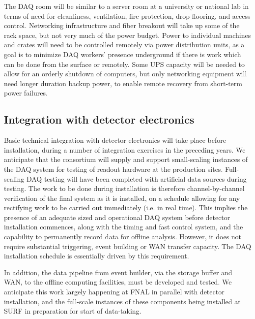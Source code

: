 The DAQ room will be similar to a server room at a university or national lab in terms of need for cleanliness, ventilation, fire protection, drop flooring, and access control. Networking infrastructure and fiber breakout will take up some of the rack space, but not very much of the power budget. Power to individual machines and crates will need to be controlled remotely via power distribution units, as a goal is to minimize DAQ workers' presence underground if there is work which can be done from the surface or remotely.  Some UPS capacity will be needed to allow for an orderly shutdown of computers, but only networking equipment will need longer duration backup power, to enable remote recovery from short-term power failures.  

\subsection{Integration with detector electronics}
\label{sec:fdsp-daq-install-transport}

Basic technical integration with detector electronics will take place before installation, during a number of integration exercises in the preceding years. We anticipate that the consortium will supply and support small-scaling instances of the DAQ system for testing of readout hardware at the production sites. Full-scaling DAQ testing will have been completed with artificial data sources during testing. The work to be done during installation is therefore channel-by-channel verification of the final system as it is installed, on a schedule allowing for any rectifying work to be carried out immediately (i.e. in real time). This implies the presence of an adequate sized and operational DAQ system before detector installation commences, along with the timing and fast control system, and the capability to permanently record data for offline analysis. However, it does not require substantial triggering, event building or WAN transfer capacity. The DAQ installation schedule is essentially driven by this requirement.

In addition, the data pipeline from event builder, via the storage buffer and WAN, to the offline computing facilities, must be developed and tested. We anticipate this work largely happening at FNAL in parallel with detector installation, and the full-scale instances of these components being installed at SURF in preparation for start of data-taking.

